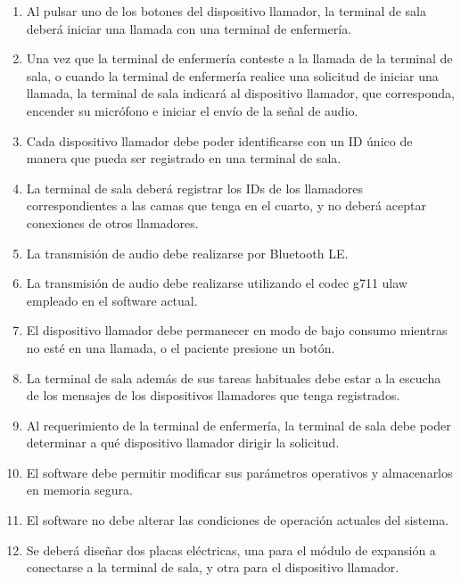 \begin{enumerate}

\item Al pulsar uno de los botones del dispositivo llamador, la terminal de sala deberá iniciar una llamada con una terminal de enfermería.

\item Una vez que la terminal de enfermería conteste a la llamada de la terminal de sala, o cuando la terminal de enfermería realice una solicitud de iniciar una llamada, la terminal de sala indicará al dispositivo llamador, que corresponda, encender su micrófono e iniciar el envío de la señal de audio.

\item Cada dispositivo llamador debe poder identificarse con un ID único de manera que pueda ser registrado en una terminal de sala.

\item La terminal de sala deberá registrar los IDs de los llamadores correspondientes a las camas que tenga en el cuarto, y no deberá aceptar conexiones de otros llamadores.

\item La transmisión de audio debe realizarse por Bluetooth LE.

\item La transmisión de audio debe realizarse utilizando el codec g711 ulaw empleado en el software actual.

\item El dispositivo llamador debe permanecer en modo de bajo consumo mientras no esté en una llamada, o el paciente presione un botón.

\item La terminal de sala además de sus tareas habituales debe estar a la escucha de los mensajes de los dispositivos llamadores que tenga registrados.

\item Al requerimiento de la terminal de enfermería, la terminal de sala debe poder determinar a qué dispositivo llamador dirigir la solicitud.

\item El software debe permitir modificar sus parámetros operativos y almacenarlos en memoria segura.

\item El software no debe alterar las condiciones de operación actuales  del sistema.

\item Se deberá diseñar dos placas eléctricas, una para el módulo de expansión a conectarse a la terminal de sala, y otra para el dispositivo llamador.

\end{enumerate}

